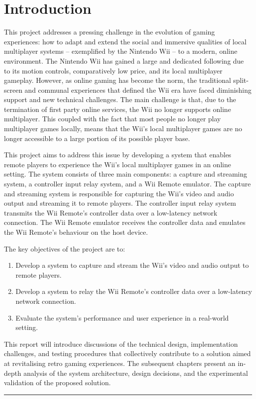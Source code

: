 \chapter{Introduction}
\hypertarget{chapter:introduction}{}

This project addresses a pressing challenge in the evolution of gaming experiences: how to adapt and extend the social and immersive qualities of local multiplayer systems -- exemplified by the Nintendo Wii -- to a modern, online environment. The Nintendo Wii has gained a large and dedicated following due to its motion controls, comparatively low price, and its local multiplayer gameplay. However, as online gaming has become the norm\cite{businesswireOnlineGaming}, the traditional split-screen and communal experiences that defined the Wii era have faced diminishing support and new technical challenges. The main challenge is that, due to the termination of first party online services\cite{nintendoTerminationNintendo}, the Wii no longer supports online multiplayer. This coupled with the fact that most people no longer play multiplayer games locally\cite{academyofanimatedartOnlineGaming}, means that the Wii’s local multiplayer games are no longer accessible to a large portion of its possible player base.

This project aims to address this issue by developing a system that enables remote players to experience the Wii’s local multiplayer games in an online setting. The system consists of three main components: a capture and streaming system, a controller input relay system, and a Wii Remote emulator. The capture and streaming system is responsible for capturing the Wii’s video and audio output and streaming it to remote players. The controller input relay system transmits the Wii Remote’s controller data over a low-latency network connection. The Wii Remote emulator receives the controller data and emulates the Wii Remote’s behaviour on the host device.

The key objectives of the project are to:
\begin{enumerate}
	\item  Develop a system to capture and stream the Wii’s video and audio output to remote players.
	\item Develop a system to relay the Wii Remote’s controller data over a low-latency network connection.
	\item Evaluate the system’s performance and user experience in a real-world setting.
\end{enumerate}

This report will introduce discussions of the technical design, implementation challenges, and testing procedures that collectively contribute to a solution aimed at revitalising retro gaming experiences. The subsequent chapters present an in-depth analysis of the system architecture, design decisions, and the experimental validation of the proposed solution.


\begin{center}
	\noindent\rule{8cm}{0.4pt}
\end{center}
